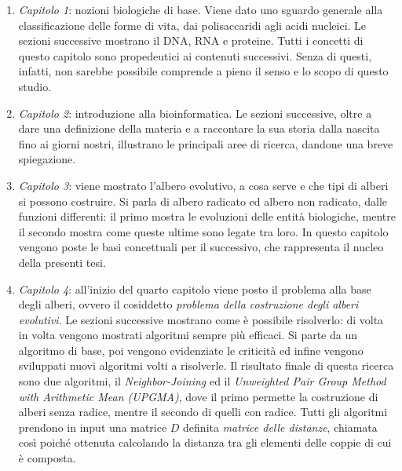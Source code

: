 \begin{enumerate}
	\item \textit{Capitolo 1}: nozioni biologiche di base. Viene dato uno sguardo generale alla classificazione delle forme di vita, dai polisaccaridi agli acidi nucleici. Le sezioni successive mostrano il DNA, RNA e proteine. Tutti i concetti di questo capitolo sono propedeutici ai contenuti successivi. Senza di questi, infatti, non sarebbe possibile comprende a pieno il senso e lo scopo di questo studio.
	\item \textit{Capitolo 2}: introduzione alla bioinformatica. Le sezioni successive, oltre a dare una definizione della materia e a raccontare la sua storia dalla nascita fino ai giorni nostri, illustrano le principali aree di ricerca, dandone una breve spiegazione.
	\item \textit{Capitolo 3}: viene mostrato l'albero evolutivo, a cosa serve e che tipi di alberi si possono costruire. Si parla di albero radicato ed albero non radicato, dalle funzioni differenti: il primo mostra le evoluzioni delle entità biologiche, mentre il secondo mostra come queste ultime sono legate tra loro. In questo capitolo vengono poste le basi concettuali per il successivo, che rappresenta il nucleo della presenti tesi.
	\item \textit{Capitolo 4}: all'inizio del quarto capitolo viene posto il problema alla base degli alberi, ovvero il cosiddetto \textit{problema della costruzione degli alberi evolutivi}. Le sezioni successive mostrano come è possibile risolverlo: di volta in volta vengono mostrati algoritmi sempre più efficaci. Si parte da un algoritmo di base, poi vengono evidenziate le criticità ed infine vengono sviluppati nuovi algoritmi volti a risolverle. Il risultato finale di questa ricerca sono due algoritmi, il \textit{Neighbor-Joining} ed il \textit{Unweighted Pair Group Method with Arithmetic Mean (UPGMA)}, dove il primo permette la costruzione di alberi senza radice, mentre il secondo di quelli con radice.
	\newline
	Tutti gli algoritmi prendono in input una matrice $D$ definita \textit{matrice delle distanze}, chiamata così poiché ottenuta calcolando la distanza tra gli elementi delle coppie di cui è composta.
\end{enumerate}

